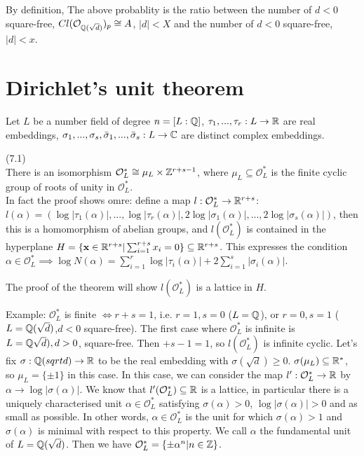 \documentclass[a4paper]{article}
\begin{document}
By definition, The above probablity is the ratio between the number of $d<0$ square-free, $Cl(\mathcal{O}_{\mathbb{Q}(\sqrt{d})})_p \cong A$, $|d| < X$ and the number of $d<0$ square-free, $|d|<x$.

\newpage

\section{Dirichlet's unit theorem}
Let $L$ be a number field of degree $n = [L:\mathbb{Q}]$, $\tau_1,...,\tau_r:L \to \mathbb{R}$ are real embeddings, $\sigma_1,...,\sigma_s,\bar{\sigma}_1,...,\bar{\sigma}_s: L \to \mathbb{C}$ are distinct complex embeddings.

\begin{thm} (7.1)\\
There is an isomorphism $\mathcal{O}_L^* \cong \mu_L \times \mathbb{Z}^{r+s-1}$, where $\mu_L \subseteq \mathcal{O}_L^*$ is the finite cyclic group of roots of unity in $\mathcal{O}_L^*$.\\
In fact the proof shows omre: define a map $l:\mathcal{O}_L^* \to \mathbb{R}^{r+s}$: $l(\alpha) = (\log |\tau_1(\alpha)|,...,\log|\tau_r(\alpha)|,2\log |\sigma_1(\alpha)|,...,2\log|\sigma_s(\alpha)|)$, then this is a homomorphism of abelian groups, and $l(\mathcal{O}_L^*)$ is contained in the hyperplane $H =\{\mathbf{x} \in \mathbb{R}^{r+s} | \sum_{i=1}^{r+s} x_i = 0\}\subseteq \mathbb{R}^{r+s}$. This expresses the condition $\alpha \in \mathcal{O}_L^* \implies \log N(\alpha) = \sum_{i=1}^r \log |\tau_i(\alpha)|+2\sum_{i=1}^s |\sigma_i(\alpha)|$.

The proof of the theorem will show $l(\mathcal{O}_L^*)$ is a lattice in $H$.

Example: $\mathcal{O}_L^*$ is finite $\iff r+s = 1$, i.e. $r=1,s=0$ ($L=\mathbb{Q}$), or $r=0,s=1$ ($L=\mathbb{Q}(\sqrt{d})$,$d<0$ square-free). The first case where $\mathcal{O}_L^*$ is infinite is $L=\mathbb{Q}\sqrt{d}), d>0$, square-free. Then $+s-1=1$, so $l(\mathcal{O}_L^*)$ is infinite cyclic. Let's fix $\sigma:\mathbb{Q}(sqrt{d}) \to \mathbb{R}$ to be the real embedding with $\sigma(\sqrt{d}) \geq 0$. $\sigma(\mu_L) \subseteq \mathbb{R}^*$, so $\mu_L = \{\pm 1\}$ in this case. In this case, we can consider the map $l':\mathcal{O}_L^* \to \mathbb{R}$ by $\alpha \to \log |\sigma(\alpha)|$. We know that $l'(\mathcal{O}_L^*) \subseteq \mathbb{R}$ is a lattice, in particular there is a uniquely characterised unit $\alpha \in \mathcal{O}_L^*$ satisfying $\sigma(\alpha)>0$, $\log |\sigma(\alpha)| > 0$ and as small as possible. In other words, $\alpha \in \mathcal{O}_L^*$ is the unit for which $\sigma(\alpha)>1$ and $\sigma(\alpha)$ is minimal with respect to this property. We call $\alpha$ the fundamental unit of $L=\mathbb{Q}(\sqrt{d})$. Then we have $\mathcal{O}_L^* = \{\pm \alpha^n | n \in \mathbb{Z}\}$.
\end{thm}
\end{document}
